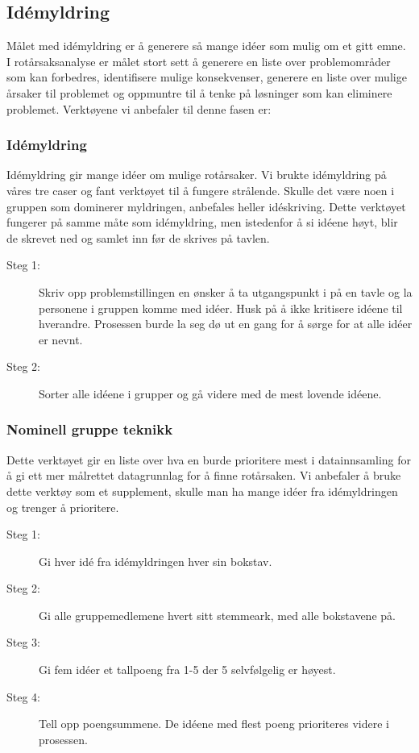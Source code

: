 \subsection{Idémyldring}
Målet med idémyldring er å generere så mange idéer som mulig om et gitt emne. I rotårsaksanalyse er målet stort sett å generere en liste over problemområder som kan forbedres, identifisere mulige konsekvenser, generere en liste over mulige årsaker til problemet og oppmuntre til å tenke på løsninger som kan eliminere problemet. Verktøyene vi anbefaler til denne fasen er:

\subsubsection{Idémyldring} Idémyldring gir mange idéer om mulige rotårsaker. Vi brukte idémyldring på våres tre caser og fant verktøyet til å fungere strålende. Skulle det være noen i gruppen som dominerer myldringen, anbefales heller idéskriving. Dette verktøyet fungerer på samme måte som idémyldring, men istedenfor å si idéene høyt, blir de skrevet ned og samlet inn før de skrives på tavlen. 

\begin{description}
    \item[Steg 1:] Skriv opp problemstillingen en ønsker å ta utgangspunkt i på en tavle og la personene i gruppen komme med idéer. Husk på å ikke kritisere idéene til hverandre. Prosessen burde la seg dø ut en gang for å sørge for at alle idéer er nevnt. 
    \item[Steg 2:] Sorter alle idéene i grupper og gå videre med de mest lovende idéene.
\end{description}

\subsubsection{Nominell gruppe teknikk} 
Dette verktøyet gir en liste over hva en burde prioritere mest i datainnsamling for å gi ett mer målrettet datagrunnlag for å finne rotårsaken. Vi anbefaler å bruke dette verktøy som et supplement, skulle man ha mange idéer fra idémyldringen og trenger å prioritere.
\begin{description}
    \item[Steg 1:] Gi hver idé fra idémyldringen hver sin bokstav.
    \item[Steg 2:] Gi alle gruppemedlemene hvert sitt stemmeark, med alle bokstavene på. 
    \item[Steg 3:] Gi fem idéer et tallpoeng fra 1-5 der 5 selvfølgelig er høyest.
    \item[Steg 4:] Tell opp poengsummene. De idéene med flest poeng prioriteres videre i prosessen.
\end{description}


